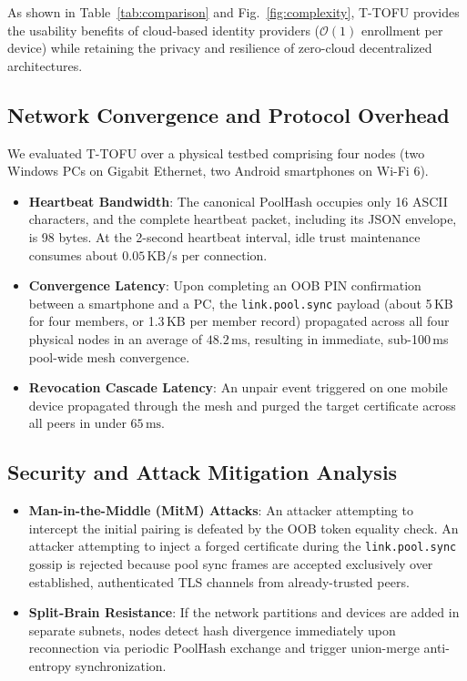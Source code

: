 \documentclass[conference,a4paper]{IEEEtran}
\begin{document}
As shown in Table~\ref{tab:comparison} and Fig.~\ref{fig:complexity}, T-TOFU provides the usability benefits of cloud-based identity providers ($\mathcal{O}(1)$ enrollment per device) while retaining the privacy and resilience of zero-cloud decentralized architectures.

\subsection{Network Convergence and Protocol Overhead}
We evaluated T-TOFU over a physical testbed comprising four nodes (two Windows PCs on Gigabit Ethernet, two Android smartphones on Wi-Fi 6).
\begin{itemize}
    \item \textbf{Heartbeat Bandwidth}: The canonical $\text{PoolHash}$ occupies only 16 ASCII characters, and the complete heartbeat packet, including its JSON envelope, is 98 bytes. At the 2-second heartbeat interval, idle trust maintenance consumes about $0.05\,\text{KB/s}$ per connection.
    \item \textbf{Convergence Latency}: Upon completing an OOB PIN confirmation between a smartphone and a PC, the \texttt{link.pool.sync} payload (about 5\,KB for four members, or 1.3\,KB per member record) propagated across all four physical nodes in an average of $48.2\,\text{ms}$, resulting in immediate, sub-100\,ms pool-wide mesh convergence.
    \item \textbf{Revocation Cascade Latency}: An unpair event triggered on one mobile device propagated through the mesh and purged the target certificate across all peers in under $65\,\text{ms}$.
\end{itemize}

\subsection{Security and Attack Mitigation Analysis}
\begin{itemize}
    \item \textbf{Man-in-the-Middle (MitM) Attacks}: An attacker attempting to intercept the initial pairing is defeated by the OOB token equality check. An attacker attempting to inject a forged certificate during the \texttt{link.pool.sync} gossip is rejected because pool sync frames are accepted exclusively over established, authenticated TLS channels from already-trusted peers.
    \item \textbf{Split-Brain Resistance}: If the network partitions and devices are added in separate subnets, nodes detect hash divergence immediately upon reconnection via periodic $\text{PoolHash}$ exchange and trigger union-merge anti-entropy synchronization.
\end{itemize}
\end{document}
